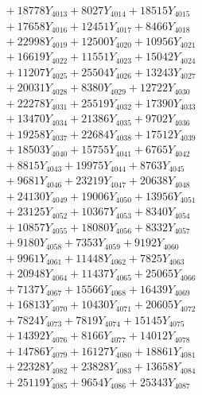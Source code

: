 \documentclass[a4paper,10pt]{article}
\begin{document}
{\begin{align}
&\;  + 18778 Y_{4013} + 8027 Y_{4014} + 18515 Y_{4015} \\[0.3ex]
&\;  + 17658 Y_{4016} + 12451 Y_{4017} + 8466 Y_{4018} \\[0.5ex]\allowbreak
&\;  + 22998 Y_{4019} + 12500 Y_{4020} + 10956 Y_{4021} \\[0.3ex]
&\;  + 16619 Y_{4022} + 11551 Y_{4023} + 15042 Y_{4024} \\[0.3ex]
&\;  + 11207 Y_{4025} + 25504 Y_{4026} + 13243 Y_{4027} \\[0.3ex]
&\;  + 20031 Y_{4028} + 8380 Y_{4029} + 12722 Y_{4030} \\[0.3ex]
&\;  + 22278 Y_{4031} + 25519 Y_{4032} + 17390 Y_{4033} \\[0.3ex]
&\;  + 13470 Y_{4034} + 21386 Y_{4035} + 9702 Y_{4036} \\[0.3ex]
&\;  + 19258 Y_{4037} + 22684 Y_{4038} + 17512 Y_{4039} \\[0.3ex]
&\;  + 18503 Y_{4040} + 15755 Y_{4041} + 6765 Y_{4042} \\[0.3ex]
&\;  + 8815 Y_{4043} + 19975 Y_{4044} + 8763 Y_{4045} \\[0.3ex]
&\;  + 9681 Y_{4046} + 23219 Y_{4047} + 20638 Y_{4048} \\[0.5ex]\allowbreak
&\;  + 24130 Y_{4049} + 19006 Y_{4050} + 13956 Y_{4051} \\[0.3ex]
&\;  + 23125 Y_{4052} + 10367 Y_{4053} + 8340 Y_{4054} \\[0.3ex]
&\;  + 10857 Y_{4055} + 18080 Y_{4056} + 8332 Y_{4057} \\[0.3ex]
&\;  + 9180 Y_{4058} + 7353 Y_{4059} + 9192 Y_{4060} \\[0.3ex]
&\;  + 9961 Y_{4061} + 11448 Y_{4062} + 7825 Y_{4063} \\[0.3ex]
&\;  + 20948 Y_{4064} + 11437 Y_{4065} + 25065 Y_{4066} \\[0.3ex]
&\;  + 7137 Y_{4067} + 15566 Y_{4068} + 16439 Y_{4069} \\[0.3ex]
&\;  + 16813 Y_{4070} + 10430 Y_{4071} + 20605 Y_{4072} \\[0.3ex]
&\;  + 7824 Y_{4073} + 7819 Y_{4074} + 15145 Y_{4075} \\[0.3ex]
&\;  + 14392 Y_{4076} + 8166 Y_{4077} + 14012 Y_{4078} \\[0.5ex]\allowbreak
&\;  + 14786 Y_{4079} + 16127 Y_{4080} + 18861 Y_{4081} \\[0.3ex]
&\;  + 22328 Y_{4082} + 23828 Y_{4083} + 13658 Y_{4084} \\[0.3ex]
&\;  + 25119 Y_{4085} + 9654 Y_{4086} + 25343 Y_{4087} \\[0.3ex]

\end{align}}
\end{document}
